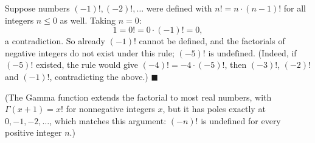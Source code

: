 Suppose numbers $(-1)!,(-2)!,\dots$ were defined with $n!=n\cdot(n-1)!$ for all integers $n\le0$ as well. Taking $n=0$:
\[
1=0!=0\cdot(-1)!=0 ,
\]
a contradiction. So already $(-1)!$ cannot be defined, and the factorials of negative integers do not exist under this rule; $\boxed{(-5)!\text{ is undefined}}$. (Indeed, if $(-5)!$ existed, the rule would give $(-4)!=-4\cdot(-5)!$, then $(-3)!$, $(-2)!$ and $(-1)!$, contradicting the above.) $\blacksquare$

(The Gamma function extends the factorial to most real numbers, with $\Gamma(x+1)=x!$ for nonnegative integers $x$, but it has poles exactly at $0,-1,-2,\dots$, which matches this argument: $(-n)!$ is undefined for every positive integer $n$.)
